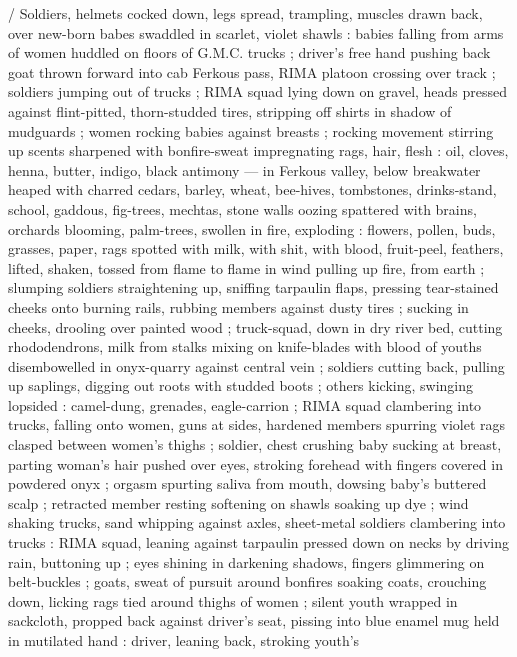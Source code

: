 {\slash} Soldiers, helmets cocked down, legs spread, trampling, muscles drawn back, over new-born
babes swaddled in scarlet, violet shawls : babies falling from arms of women huddled on floors of
G.M.C. trucks ; driver's free hand pushing back goat thrown forward into cab {\semislash} Ferkous
pass, RIMA platoon crossing over track ; soldiers jumping out of trucks ; RIMA squad lying down on
gravel, heads pressed against flint-pitted, thorn-studded tires, stripping off shirts in shadow of
mudguards ; women rocking babies against breasts ; rocking movement stirring up scents sharpened
with bonfire-sweat impregnating rags, hair, flesh : oil, cloves, henna, butter, indigo, black
antimony --- in Ferkous valley, below breakwater heaped with charred cedars, barley, wheat,
bee-hives, tombstones, drinks-stand, school, gaddous, fig-trees, mechtas, stone walls oozing
spattered with brains, orchards blooming, palm-trees, swollen in fire, exploding : flowers, pollen,
buds, grasses, paper, rags spotted with milk, with shit, with blood, fruit-peel, feathers, lifted,
shaken, tossed from flame to flame in wind pulling up fire, from earth ; slumping soldiers
straightening up, sniffing tarpaulin flaps, pressing tear-stained cheeks onto burning rails, rubbing
members against dusty tires ; sucking in cheeks, drooling over painted wood ; truck-squad, down in
dry river bed, cutting rhododendrons, milk from stalks mixing on knife-blades with blood of youths
disembowelled in onyx-quarry against central vein ; soldiers cutting back, pulling up saplings,
digging out roots with studded boots ; others kicking, swinging lopsided : camel-dung, grenades,
eagle-carrion ; RIMA squad clambering into trucks, falling onto women, guns at sides, hardened %
members spurring violet rags clasped between women's thighs ; soldier, chest crushing baby sucking
at breast, parting woman's hair pushed over eyes, stroking forehead with fingers covered in powdered
onyx ; orgasm spurting saliva from mouth, dowsing baby's buttered scalp ; retracted member resting
softening on shawls soaking up dye ; wind shaking trucks, sand whipping against axles, sheet-metal
{\semislash} soldiers clambering into trucks : RIMA squad, leaning against tarpaulin pressed down on
necks by driving rain, buttoning up ; eyes shining in darkening shadows, fingers glimmering on
belt-buckles ; goats, sweat of pursuit around bonfires soaking coats, crouching down, licking rags
tied around thighs of women ; silent youth wrapped in sackcloth, propped back against driver's seat,
pissing into blue enamel mug held in mutilated hand : driver, leaning back, stroking youth's
